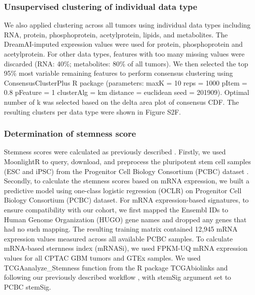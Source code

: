\subsubsection{Unsupervised clustering of individual data type}
We also applied clustering across all tumors using individual data types including RNA, protein, phosphoprotein, acetylprotein, lipids, and metabolites. The DreamAI-imputed expression values were used for protein, phosphoprotein and acetylprotein. For other data types, features with too many missing values were discarded (RNA: 40\%; metabolites: 80\% of all tumors). We then selected the top 95\% most variable remaining features to perform consensus clustering using ConsensusClusterPlus R package (parameters: maxK = 10 reps = 1000 pItem = 0.8 pFeature = 1 clusterAlg = \textquotedbl{}km\textquotedbl{} distance = \textquotedbl{}euclidean\textquotedbl{} seed = 201909). Optimal number of k was selected based on the delta area plot of consensus CDF. The resulting clusters per data type were shown in Figure S2F.

\subsubsection{Determination of stemness score}
Stemness scores were calculated as previously described \cite{maltatm_wiznerowiczm:MachineLearning2018}. Firstly, we used MoonlightR \cite{colapricoa_papaleoe:InterpretingPathways2020} to query, download, and preprocess the pluripotent stem cell samples (ESC and iPSC) from the Progenitor Cell Biology Consortium (PCBC) dataset \cite{dailyk_ombergl:MolecularPhenotypic2017,salomonisn_lutzkoc:IntegratedGenomic2016}. Secondly, to calculate the stemness scores based on mRNA expression, we built a predictive model using one-class logistic regression (OCLR) \cite{sokolova_stuartjm:ONECLASSDETECTION2016} on Progenitor Cell Biology Consortium (PCBC) dataset. For mRNA expression-based signatures, to ensure compatibility with our cohort, we first mapped the Ensembl IDs to Human Genome Organization (HUGO) gene names and dropped any genes that had no such mapping. The resulting training matrix contained 12,945 mRNA expression values measured across all available PCBC samples. To calculate mRNA-based sternness index (mRNASi), we used FPKM-UQ mRNA expression values for all CPTAC GBM tumors and GTEx samples. We used TCGAanalyze\_Stemness function from the R package TCGAbiolinks \cite{colapricoa_noushmehrh:TCGAbiolinksBioconductor2016} and following our previously described workflow \cite{silvatc_noushmehrh:TCGAWorkflow2016}, with \textquotedbl{}stemSig\textquotedbl{} argument set to PCBC stemSig.

